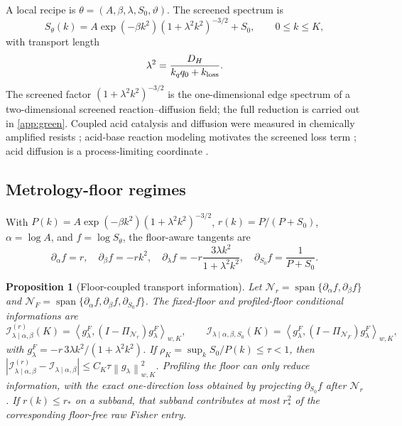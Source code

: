 \documentclass[11pt]{article}
\newtheorem{proposition}{Proposition}
\newcommand{\calI}{\mathcal I}
\newcommand{\calN}{\mathcal N}
\newcommand{\inner}[2]{\left\langle #1,#2\right\rangle}
\newcommand{\norm}[1]{\left\lVert #1\right\rVert}
\begin{document}
A local recipe is \(\theta=(A,\beta,\lambda,S_0,\vartheta)\). The screened spectrum is
\begin{equation}
S_\theta(k)=A\exp(-\beta k^2)(1+\lambda^2 k^2)^{-3/2}+S_0,\qquad 0\leq k\leq K,
\label{eq:screened-psd}
\end{equation}
with transport length
\begin{equation}
\lambda^2=\frac{D_H}{k_q q_0+k_{\rm loss}}.
\label{eq:lambda-chem}
\end{equation}
The screened factor \((1+\lambda^2k^2)^{-3/2}\) is the one-dimensional edge spectrum of a two-dimensional screened reaction--diffusion field; the full reduction is carried out in \cref{app:green}. Coupled acid catalysis and diffusion were measured in chemically amplified resists \cite{houle2000}; acid-base reaction modeling motivates the screened loss term \cite{houle2004}; acid diffusion is a process-limiting coordinate \cite{vansteenwinckel2005}.

\subsection{Metrology-floor regimes}

With \(P(k)=A\exp(-\beta k^2)(1+\lambda^2k^2)^{-3/2}\), \(r(k)=P/(P+S_0)\), \(\alpha=\log A\), and \(f=\log S_\theta\), the floor-aware tangents are
\begin{equation}
\partial_\alpha f=r,\quad \partial_\beta f=-rk^2,\quad
\partial_\lambda f=-r\frac{3\lambda k^2}{1+\lambda^2k^2},\quad
\partial_{S_0}f=\frac{1}{P+S_0}.
\label{eq:floor-tangents}
\end{equation}

\begin{proposition}[Floor-coupled transport information]
\label{prop:floor-coupling}
Let \(\calN_r=\operatorname{span}\{\partial_\alpha f,\partial_\beta f\}\) and \(\calN_F=\operatorname{span}\{\partial_\alpha f,\partial_\beta f,\partial_{S_0}f\}\). The fixed-floor and profiled-floor conditional informations are
\[
\calI_{\lambda\mid\alpha,\beta}^{(r)}(K)=\inner{g_\lambda^F}{(I-\Pi_{\calN_r})g_\lambda^F}_{w,K},
\qquad
\calI_{\lambda\mid\alpha,\beta,S_0}(K)=\inner{g_\lambda^F}{(I-\Pi_{\calN_F})g_\lambda^F}_{w,K},
\]
with \(g_\lambda^F=-r\,3\lambda k^2/(1+\lambda^2k^2)\). If \(\rho_K=\sup_k S_0/P(k)\le\tau<1\), then \(|\calI_{\lambda\mid\alpha,\beta}^{(r)}-\calI_{\lambda\mid\alpha,\beta}|\le C_K\tau\norm{g_\lambda}_{w,K}^2\). Profiling the floor can only reduce information, with the exact one-direction loss obtained by projecting \(\partial_{S_0}f\) after \(\calN_r\). If \(r(k)\le r_*\) on a subband, that subband contributes at most \(r_*^2\) of the corresponding floor-free raw Fisher entry.
\end{proposition}
\end{document}
